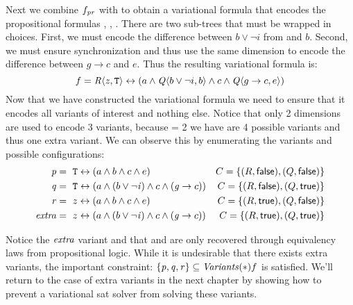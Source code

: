 Next we combine $f_{\mathit{p}\mathit{r}}$ with \qV{} to obtain a variational formula that encodes the
propositional formulas \pV{}, \qV{}, \rV{}. There are two sub-trees that must be
wrapped in choices. First, we must encode the difference between $b \vee \neg i$
from \qV{} and $b$. Second, we must ensure synchronization and thus use the same
dimension to encode the difference between $g \rightarrow c$ and $e$. Thus the
resulting variational formula is:
%
\begin{equation*}
  f = \chc[\dimR]{\zV, \tru{}} \leftrightarrow (a \wedge \chc[\dimQ]{b \vee \neg i, b} \wedge c \wedge \chc[\dimQ]{g \rightarrow c, e})
\end{equation*}
%
Now that we have constructed the variational formula we need to ensure that it
encodes all variants of interest and nothing else. Notice that only 2 dimensions
are used to encode 3 variants, because  = 2 we have are 4
possible variants and thus one extra variant. We can observe this by enumerating
the variants and possible configurations:
%
\begin{align*}
  \pV &=\ \tru{} \leftrightarrow (a \wedge b \wedge c \wedge e)                          & C = \{(\dimR, \false), (\dimQ, \false)\} \\
  \qV &=\ \tru{} \leftrightarrow (a \wedge (b \vee \neg \iV{}) \wedge c \wedge (\gV{} \rightarrow c))   & C = \{(\dimR, \false), (\dimQ, \true)\} \\
  \rV &=~z \leftrightarrow (a \wedge b \wedge c \wedge e)                               & C = \{(\dimR, \true), (\dimQ, \false)\} \\
  \kf{extra} &=~z \leftrightarrow (a \wedge (b \vee \neg \iV{}) \wedge c \wedge (\gV{} \rightarrow c)) & C = \{(\dimR, \true), (\dimQ, \true)\}
\end{align*}
%

Notice the $\mathit{extra}$ variant and that \pV{} and \qV{} are only recovered
through equivalency laws from propositional logic. While it is undesirable that
there exists extra variants, the important constraint: $\{ \mathit{p}, \mathit{q}, \mathit{r} \}
\subseteq \mathit{Variants}(*){f}$ is satisfied. We'll return to the case of extra
variants in the next chapter by showing how to prevent a variational \ac{sat}
solver from solving these variants.



